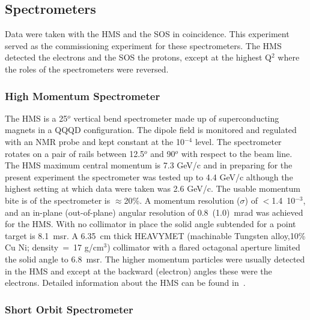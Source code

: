 \documentclass[aps,prl,twocolumn,showpacs,amsmath,amssymb,floats]{revtex4}
\begin{document}
\subsection*{Spectrometers} 

Data were taken with the HMS and the SOS in coincidence.  This experiment served 
as the commissioning experiment for these spectrometers.  The HMS detected the 
electrons and the SOS the protons, except at the highest Q$^2$ where the roles 
of the spectrometers were reversed.

\subsubsection*{High Momentum Spectrometer}

The HMS is a 25$^o$ vertical bend spectrometer made up of superconducting 
magnets in a QQQD configuration.  The dipole field is monitored and regulated 
with an NMR probe and kept constant at the 10$^{-4}$ level.  The spectrometer 
rotates on a 
pair of rails between 12.5$^o$ and 90$^o$ with respect to the beam line.  The 
HMS maximum central momentum is 7.3 GeV/c and in preparing for the present 
experiment the spectrometer was tested up to 4.4 GeV/c although the highest 
setting at which data were taken was 2.6 GeV/c.  The usable momentum bite is 
of the spectrometer is $\approx$20\%. A momentum resolution ($\sigma$) of $<$1.4~10$^{-3}$, 
and an in-plane (out-of-plane) angular resolution of 0.8~(1.0)~mrad was 
achieved for the HMS.  With no collimator in place the solid angle subtended for a
point target is 8.1~msr.  A  6.35~cm thick HEAVYMET (machinable Tungsten alloy,10\% Cu Ni; 
density~=~17 g/cm$^3$) collimator with a flared octagonal aperture 
limited the solid angle to 6.8~msr.  The 
higher momentum 
particles were usually detected in the HMS and except at the backward (electron) 
angles these were the electrons.  Detailed information about the HMS can be 
found in~\cite{jlab3}.

\subsubsection*{Short Orbit Spectrometer}
\end{document}
